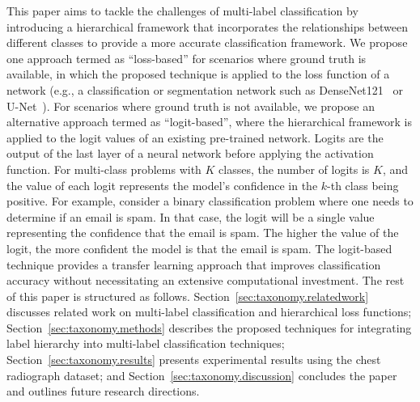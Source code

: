 This paper aims to tackle the challenges of multi-label classification by introducing a hierarchical framework that incorporates the relationships between different classes to provide a more accurate classification framework. We propose one approach termed as ``loss-based'' for scenarios where ground truth is available, in which the proposed technique is applied to the loss function of a network (e.g., a classification or segmentation network such as DenseNet121~\cite{huang_Densely_2017} or U-Net~\cite{ronneberger_UNet_2015}). For scenarios where ground truth is not available, we propose an alternative approach termed as ``logit-based'', where the hierarchical framework is applied to the logit values of an existing pre-trained network. Logits are the output of the last layer of a neural network before applying the activation function. For multi-class problems with $K$ classes, the number of logits is $K$, and the value of each logit represents the model's confidence in the $k$-th class being positive. For example, consider a binary classification problem where one needs to determine if an email is spam. In that case, the logit will be a single value representing the confidence that the email is spam. The higher the value of the logit, the more confident the model is that the email is spam.
The logit-based technique provides a transfer learning approach that improves classification accuracy without necessitating an extensive computational investment. The rest of this paper is structured as follows. Section~\ref{sec:taxonomy.relatedwork} discusses related work on multi-label classification and hierarchical loss functions; Section~\ref{sec:taxonomy.methods} describes the proposed techniques for integrating label hierarchy into multi-label classification techniques; Section~\ref{sec:taxonomy.results} presents experimental results using the chest radiograph dataset; and Section~\ref{sec:taxonomy.discussion} concludes the paper and outlines future research directions.

